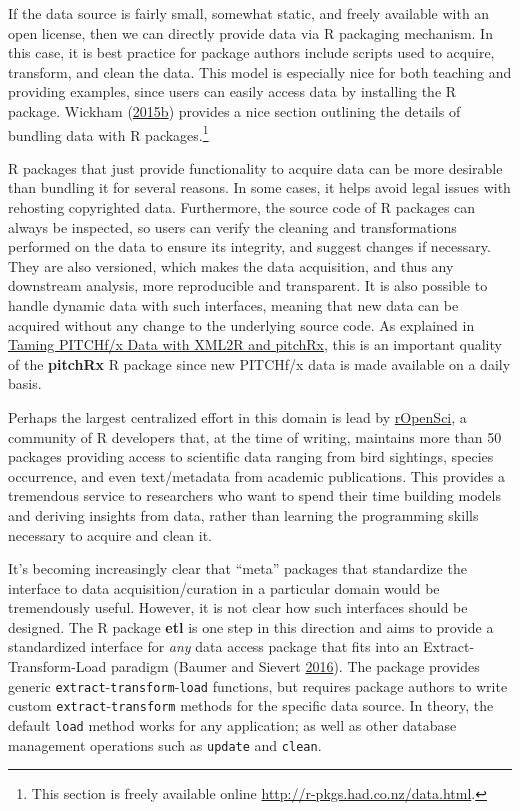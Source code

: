 \documentclass[12pt,]{isuthesis}
\let\rmarkdownfootnote\footnote%
\def\footnote{\protect\rmarkdownfootnote}
\begin{document}
If the data source is fairly small, somewhat static, and freely
available with an open license, then we can directly provide data via R
packaging mechanism. In this case, it is best practice for package
authors include scripts used to acquire, transform, and clean the data.
This model is especially nice for both teaching and providing examples,
since users can easily access data by installing the R package. Wickham
(\protect\hyperlink{ref-rpkgs}{2015}\protect\hyperlink{ref-rpkgs}{b})
provides a nice section outlining the details of bundling data with R
packages.\footnote{This section is freely available online
  \url{http://r-pkgs.had.co.nz/data.html}.}

R packages that just provide functionality to acquire data can be more
desirable than bundling it for several reasons. In some cases, it helps
avoid legal issues with rehosting copyrighted data. Furthermore, the
source code of R packages can always be inspected, so users can verify
the cleaning and transformations performed on the data to ensure its
integrity, and suggest changes if necessary. They are also versioned,
which makes the data acquisition, and thus any downstream analysis, more
reproducible and transparent. It is also possible to handle dynamic data
with such interfaces, meaning that new data can be acquired without any
change to the underlying source code. As explained in
\protect\hyperlink{taming-pitchfx-data-with-xml2r-and-pitchrx}{Taming
PITCHf/x Data with XML2R and pitchRx}, this is an important quality of
the \textbf{pitchRx} R package since new PITCHf/x data is made available
on a daily basis.

Perhaps the largest centralized effort in this domain is lead by
\href{https://ropensci.org}{rOpenSci}, a community of R developers that,
at the time of writing, maintains more than 50 packages providing access
to scientific data ranging from bird sightings, species occurrence, and
even text/metadata from academic publications. This provides a
tremendous service to researchers who want to spend their time building
models and deriving insights from data, rather than learning the
programming skills necessary to acquire and clean it.

It's becoming increasingly clear that ``meta'' packages that standardize
the interface to data acquisition/curation in a particular domain would
be tremendously useful. However, it is not clear how such interfaces
should be designed. The R package \textbf{etl} is one step in this
direction and aims to provide a standardized interface for \emph{any}
data access package that fits into an Extract-Transform-Load paradigm
(Baumer and Sievert \protect\hyperlink{ref-etl}{2016}). The package
provides generic \texttt{extract}-\texttt{transform}-\texttt{load}
functions, but requires package authors to write custom
\texttt{extract}-\texttt{transform} methods for the specific data
source. In theory, the default \texttt{load} method works for any
application; as well as other database management operations such as
\texttt{update} and \texttt{clean}.
\end{document}
